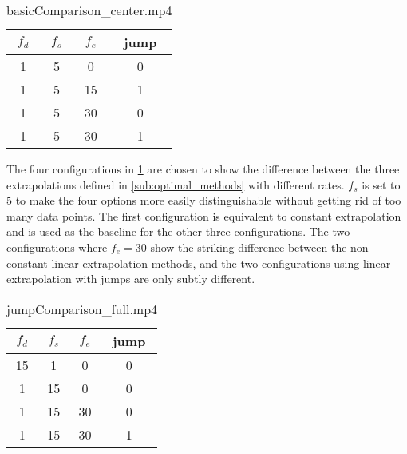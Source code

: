 \begin{table}[H]
    \begin{center}
    \caption{basicComparison\_center.mp4}%
    \label{tab:exampleOne}
    \begin{tabular}{c|c|c|c}
        \toprule
        $f_d$ & $f_s$ & $f_e$ & jump \\
        \midrule
        1 & 5 & 0 & 0 \\
        1 & 5 & 15 & 1 \\
        1 & 5 & 30 & 0 \\
        1 & 5 & 30 & 1 \\
        \bottomrule
    \end{tabular}
    \end{center}

\end{table}

The four configurations in \cref{tab:exampleOne} are chosen to show the difference between the three extrapolations defined in \cref{sub:optimal_methods} with different rates.
$f_s$ is set to $5$ to make the four options more easily distinguishable without getting rid of too many data points.
The first configuration is equivalent to constant extrapolation and is used as the baseline for the other three configurations.
The two configurations where $f_e = 30$ show the striking difference between the non-constant linear extrapolation methods, and the two configurations using linear extrapolation with jumps are only subtly different.

\begin{table}[H]
    \begin{center}
    \caption{jumpComparison\_full.mp4}%
    \label{tab:exampleTwo}
    \begin{tabular}{c|c|c|c}
        \toprule
        $f_d$ & $f_s$ & $f_e$ & jump \\
        \midrule
        15 & 1 & 0 & 0 \\
        1 & 15 & 0 & 0 \\
        1 & 15 & 30 & 0 \\
        1 & 15 & 30 & 1 \\
        \bottomrule
    \end{tabular}
    \end{center}

\end{table}

